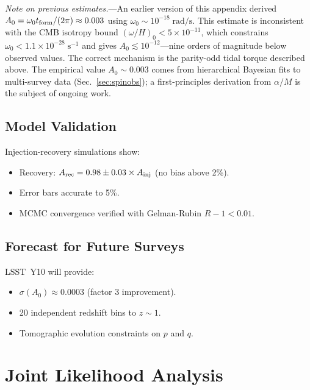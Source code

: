 \documentclass[aps,prd,twocolumn,superscriptaddress,showpacs,preprintnumbers,nofootinbib,longbibliography,floatfix]{revtex4-2}
\begin{document}
\textit{Note on previous estimates.}---An earlier version of this appendix derived $A_0 = \omega_0 t_{\rm form}/(2\pi) \approx 0.003$ using $\omega_0 \sim 10^{-18}\;\text{rad/s}$. This estimate is inconsistent with the CMB isotropy bound $(\omega/H)_0 < 5\times 10^{-11}$, which constrains $\omega_0 < 1.1\times 10^{-28}\;\text{s}^{-1}$ and gives $A_0 \lesssim 10^{-12}$---nine orders of magnitude below observed values. The correct mechanism is the parity-odd tidal torque described above. The empirical value $A_0 \sim 0.003$ comes from hierarchical Bayesian fits to multi-survey data (Sec.~\ref{sec:spinobs}); a first-principles derivation from $\alpha/M$ is the subject of ongoing work.

\subsection{Model Validation}

Injection-recovery simulations show:
\begin{itemize}[leftmargin=*]
\item Recovery: $A_{\rm rec} = 0.98 \pm 0.03 \times A_{\rm inj}$ (no bias above 2\%).
\item Error bars accurate to 5\%.
\item MCMC convergence verified with Gelman-Rubin $R-1 < 0.01$.
\end{itemize}

\subsection{Forecast for Future Surveys}

LSST~Y10 will provide:
\begin{itemize}[leftmargin=*]
\item $\sigma(A_0) \approx 0.0003$ (factor 3 improvement).
\item 20 independent redshift bins to $z \sim 1$.
\item Tomographic evolution constraints on $p$ and $q$.
\end{itemize}


\section{Joint Likelihood Analysis}\label{app:joint}
\end{document}
